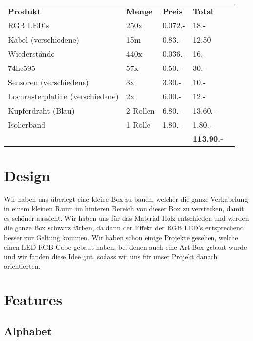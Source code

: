 \documentclass[12pt,a4paper]{article}
\begin{document}
\begin{tabularx}{\textwidth}{p{} | l | l | l | r |}
    \textbf{Produkt} & \textbf{Menge} & \textbf{Preis} & \textbf{Total} \\
    \cline{1-4}
    RGB LED's & 250x & 0.072.- & 18.- \\
    \cline{1-4}
    Kabel (verschiedene) & 15m & 0.83.- & 12.50 \\
    \cline{1-4}
    Wiederstände & 440x & 0.036.- & 16.- \\
    \cline{1-4}
    74hc595 & 57x & 0.50.- & 30.- \\   
    \cline{1-4}
    Sensoren (verschiedene) & 3x & 3.30.- & 10.- \\
    \cline{1-4}
    Lochrasterplatine (verschiedene) & 2x & 6.00.- & 12.- \\
    \cline{1-4}
    Kupferdraht (Blau) & 2 Rollen & 6.80.- & 13.60.- \\
    \cline{1-4}
    Isolierband & 1 Rolle & 1.80.- & 1.80.- \\
    \cline{1-4}
    &&&\textbf{113.90.-}
    
\end{tabularx}

\section{Design}

Wir haben uns überlegt eine kleine Box zu bauen, welcher die ganze Verkabelung in einem
kleinen Raum im hinteren Bereich von dieser Box zu verstecken, damit es schöner aussieht.
Wir haben uns für das Material Holz entschieden und werden die ganze Box schwarz färben,
da dann der Effekt der RGB LED's entsprechend besser zur Geltung kommen.
Wir haben schon einige Projekte gesehen, welche einen LED RGB Cube gebaut haben, bei denen auch eine 
Art Box gebaut wurde und wir fanden diese Idee gut, sodass wir uns für unser Projekt danach orientierten.



\section{Features}

\subsection{Alphabet}
\end{document}
